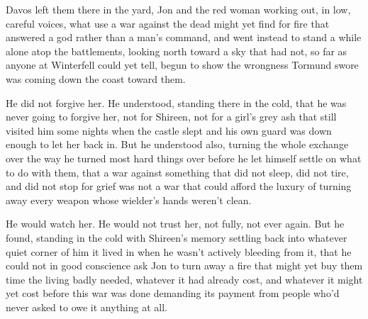 \sceneBreak

Davos left them there in the yard, Jon and the red woman working out, in low, careful voices, what use a war against the dead might yet find for fire that answered a god rather than a man’s command, and went instead to stand a while alone atop the battlements, looking north toward a sky that had not, so far as anyone at Winterfell could yet tell, begun to show the wrongness Tormund swore was coming down the coast toward them.

He did not forgive her. He understood, standing there in the cold, that he was never going to forgive her, not for Shireen, not for a girl’s grey ash that still visited him some nights when the castle slept and his own guard was down enough to let her back in. But he understood also, turning the whole exchange over the way he turned most hard things over before he let himself settle on what to do with them, that a war against something that did not sleep, did not tire, and did not stop for grief was not a war that could afford the luxury of turning away every weapon whose wielder’s hands weren’t clean.

He would watch her. He would not trust her, not fully, not ever again. But he found, standing in the cold with Shireen’s memory settling back into whatever quiet corner of him it lived in when he wasn’t actively bleeding from it, that he could not in good conscience ask Jon to turn away a fire that might yet buy them time the living badly needed, whatever it had already cost, and whatever it might yet cost before this war was done demanding its payment from people who’d never asked to owe it anything at all.